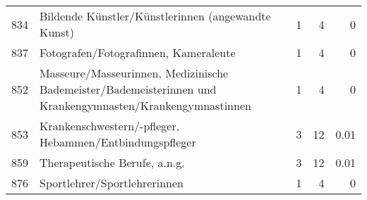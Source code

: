 \begin{longtable}{lXrrr}
     834 &
     \multicolumn{1}{X}{ Bildende Künstler/Künstlerinnen (angewandte Kunst)   } &


       \num{1} &
       \num[round-mode=places,round-precision=2]{4} &
         \num[round-mode=places,round-precision=2]{0} \\

     837 &
     \multicolumn{1}{X}{ Fotografen/Fotografinnen, Kameraleute   } &


       \num{1} &
       \num[round-mode=places,round-precision=2]{4} &
         \num[round-mode=places,round-precision=2]{0} \\

     852 &
     \multicolumn{1}{X}{ Masseure/Masseurinnen, Medizinische Bademeister/Bademeisterinnen und Krankengymnasten/Krankengymnastinnen   } &


       \num{1} &
       \num[round-mode=places,round-precision=2]{4} &
         \num[round-mode=places,round-precision=2]{0} \\

     853 &
     \multicolumn{1}{X}{ Krankenschwestern/-pfleger, Hebammen/Entbindungspfleger   } &


       \num{3} &
       \num[round-mode=places,round-precision=2]{12} &
         \num[round-mode=places,round-precision=2]{0,01} \\

     859 &
     \multicolumn{1}{X}{ Therapeutische Berufe, a.n.g.   } &


       \num{3} &
       \num[round-mode=places,round-precision=2]{12} &
         \num[round-mode=places,round-precision=2]{0,01} \\

     876 &
     \multicolumn{1}{X}{ Sportlehrer/Sportlehrerinnen   } &


       \num{1} &
       \num[round-mode=places,round-precision=2]{4} &
         \num[round-mode=places,round-precision=2]{0} \\


\end{longtable}
